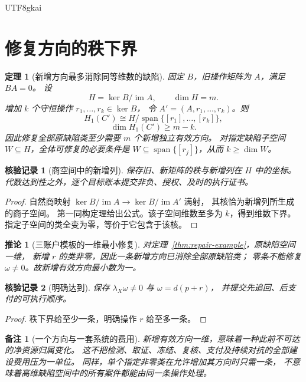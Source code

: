 \documentclass[12pt,a4paper,openany]{report}
\newtheorem{theorem}{定理}[chapter]
\newtheorem{corollary}{推论}[chapter]
\newtheorem{remark}{备注}[chapter]
\newtheorem{Certificate}{核验记录}[chapter]
\newcommand{\im}{\operatorname{im}}
\newcommand{\spanof}{\operatorname{span}}
\begin{document}
\begin{CJK*}{UTF8}{gkai}
\section{修复方向的秩下界}
\begin{theorem}[新增方向最多消除同等维数的缺陷]
\label{thm:rank-min}
固定 \(B\)，旧操作矩阵为 \(A\)，满足 \(BA=0\)。
设
\[
H=\ker B/\im A,\qquad \dim H=m.
\]
增加 \(k\) 个守恒操作 \(r_1,\ldots,r_k\in\ker B\)，
令 \(A'=(A,r_1,\ldots,r_k)\)。则
\[
H_1(C')\cong
H/\spanof\{[r_1],\ldots,[r_k]\},
\]
\[
\dim H_1(C')\ge m-k.
\]
因此修复全部原缺陷类至少需要 \(m\) 个新增独立有效方向。
对指定缺陷子空间 \(W\subseteq H\)，全体可修复的必要条件是
\(W\subseteq\spanof\{[r_j]\}\)，从而 \(k\ge\dim W\)。
\end{theorem}
\begin{Certificate}[商空间中的新增列]
保存旧、新矩阵的秩与新增列在 \(H\) 中的坐标。
代数达到性之外，逐个目标账本提交非负、授权、及时的执行证书。
\end{Certificate}
\begin{proof}
自然商映射 \(\ker B/\im A\to\ker B/\im A'\) 满射，
其核恰为新增列所生成的商子空间。
第一同构定理给出公式。该子空间维数至多为 \(k\)，得到维数下界。
指定子空间的类全变为零，等价于它包含于该核。
\end{proof}

\begin{corollary}[三账户模板的一维最小修复]
\label{cor:rank-one}
对定理~\ref{thm:repair-example}，原缺陷空间一维，
新增 \(r\) 的类非零，因此一条新增方向已消除全部原缺陷类；
零条不能修复 \(\omega\ne0\)。故新增有效方向最小数为一。
\end{corollary}
\begin{Certificate}[明确达到]
保存 \(\lambda_X\omega\ne0\) 与 \(\omega=d(p+r)\)，
并提交先追回、后支付的可执行顺序。
\end{Certificate}
\begin{proof}
秩下界给至少一条，明确操作 \(r\) 给至多一条。
\end{proof}

\begin{remark}[一个方向与一套系统的费用]
新增有效方向一维，意味着一种此前不可达的净资源归属变化。
这不把检测、取证、冻结、复核、支付及持续对抗的全部建设费用压为一单位。
同样，单个指定非零类在允许增加其方向时只需一条，
不意味着高维缺陷空间中的所有案件都能由同一条操作处理。
\end{remark}


\end{CJK*}
\end{document}
